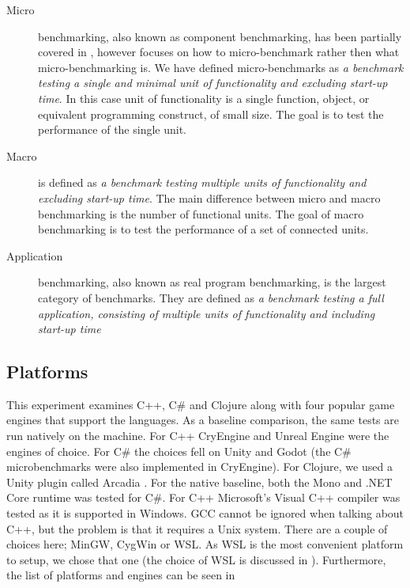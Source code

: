 \begin{description}
    \item[Micro] benchmarking, also known as component benchmarking, has been partially covered in , however  focuses on how to micro-benchmark rather then what micro-benchmarking is. We have defined micro-benchmarks as \textit{a benchmark testing a single and minimal unit of functionality and excluding start-up time}. In this case unit of functionality is a single function, object, or equivalent programming construct, of small size. The goal is to test the performance of the single unit.
    \item[Macro] is defined as \textit{a benchmark testing multiple units of functionality and excluding start-up time}. The main difference between micro and macro benchmarking is the number of functional units. The goal of macro benchmarking is to test the performance of a set of connected units.
    \item[Application] benchmarking, also known as real program benchmarking, is the largest category of benchmarks. They are defined as \textit{a benchmark testing a full application, consisting of multiple units of functionality and including start-up time}
\end{description}

\subsection{Platforms}
This experiment examines C++, C\# and Clojure along with four popular game engines that support the languages. As a baseline comparison, the same tests are run natively on the machine. For C++ CryEngine and Unreal Engine were the engines of choice. For C\# the choices fell on Unity and Godot (the C\# microbenchmarks were also implemented in CryEngine). For Clojure, we used a Unity plugin called Arcadia \cite{arcadia:github}. For the native baseline, both the Mono and .NET Core runtime was tested for C\#. For C++ Microsoft's Visual C++ compiler was tested as it is supported in Windows. \ac{GCC} cannot be ignored when talking about C++, but the problem is that it requires a Unix system. There are a couple of choices here; MinGW, CygWin or \ac{WSL}. As \ac{WSL} is the most convenient platform to setup, we chose that one (the choice of \ac{WSL} is discussed in ). Furthermore, the list of platforms and engines can be seen in 

